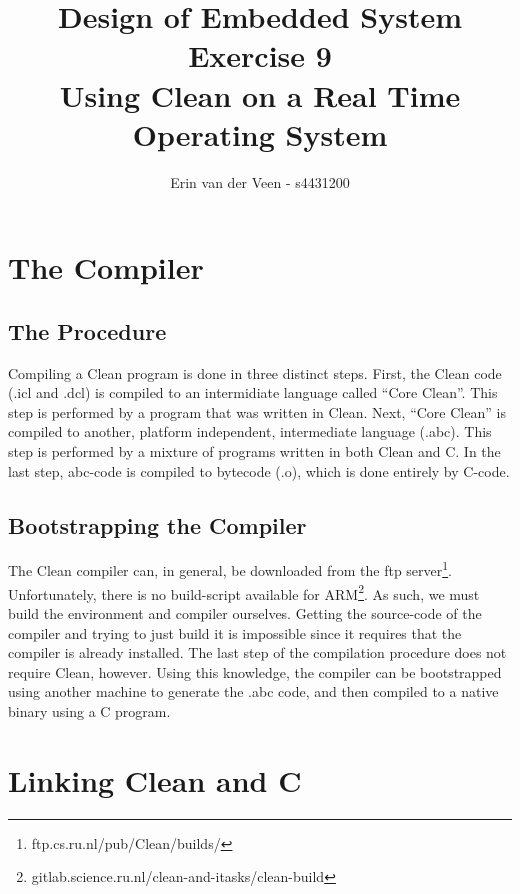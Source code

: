\documentclass{scrartcl}
\title{Design of Embedded System\\Exercise 9\\Using Clean on a Real Time Operating System}
\author{Erin van der Veen - s4431200}
\begin{document}
\maketitle

\tableofcontents
\pagebreak

\section{The Compiler}
\subsection{The Procedure}
Compiling a Clean program is done in three distinct steps.
First, the Clean code (.icl and .dcl) is compiled to an intermidiate language called ``Core Clean''.
This step is performed by a program that was written in Clean.
Next, ``Core Clean'' is compiled to another, platform independent, intermediate language (.abc).
This step is performed by a mixture of programs written in both Clean and C.
In the last step, abc-code is compiled to bytecode (.o), which is done entirely by C-code.

\subsection{Bootstrapping the Compiler}
The Clean compiler can, in general, be downloaded from the ftp server\footnote{ftp.cs.ru.nl/pub/Clean/builds/}.
Unfortunately, there is no build-script available for ARM\footnote{gitlab.science.ru.nl/clean-and-itasks/clean-build}.
As such, we must build the environment and compiler ourselves.
Getting the source-code of the compiler and trying to just build it is impossible since it requires that the compiler is already installed.
The last step of the compilation procedure does not require Clean, however.
Using this knowledge, the compiler can be bootstrapped using another machine to generate the .abc code, and then compiled to a native binary using a C program.

\section{Linking Clean and C}
\end{document}
